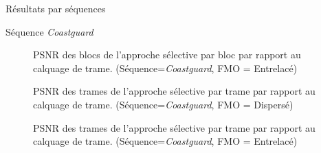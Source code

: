 \begin{section}{Résultats par séquences}
\begin{subsection}{Séquence \textit{Coastguard}}
\begin{figure}  \caption[]{PSNR des blocs de l'approche sélective par bloc par rapport au
calquage de trame. (Séquence=\textit{Coastguard}, FMO = Entrelacé)}
\label{fig-ParSequenceInterleaved6}
\end{figure}

\begin{figure}  \caption[]{PSNR des trames de l'approche sélective par trame par rapport au
calquage de trame. (Séquence=\textit{Coastguard}, FMO = Dispersé)}
\label{fig-ParSequenceFrameDispersed6}
\end{figure}

\begin{figure}  \caption[]{PSNR des trames de l'approche sélective par trame par rapport au
calquage de trame. (Séquence=\textit{Coastguard}, FMO = Entrelacé)}
\label{fig-ParSequenceFrameInterleaved6}
\end{figure}


\end{subsection}
\end{section}
